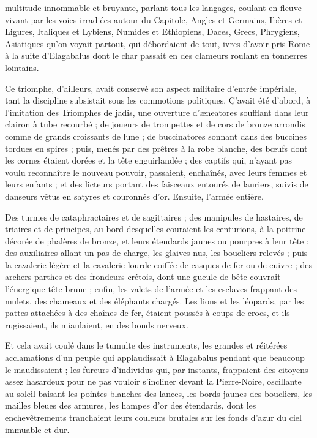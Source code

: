 \documentclass[a4paper, 11pt, oneside, polutonikogreek, french]{article}
\begin{document}
multitude innommable et bruyante, parlant tous les langages, coulant en fleuve vivant par les voies irradiées autour du Capitole, Angles et Germains, Ibères et Ligures, Italiques et Lybiens, Numides et Ethiopiens, Daces, Grecs, Phrygiens, Asiatiques qu'on voyait partout, qui débordaient de tout, ivres d'avoir pris Rome à la suite d'Elagabalus dont le char passait en des clameurs roulant en tonnerres lointains.

Ce triomphe, d'ailleurs, avait conservé son aspect militaire d'entrée impériale, tant la discipline subsistait sous les commotions politiques. Ç'avait été d'abord, à l'imitation des Triomphes de jadis, une ouverture d'æneatores soufflant dans leur clairon à tube recourbé ; de joueurs de trompettes et de cors de bronze arrondis comme de grands croissants de lune ; de buccinatores sonnant dans des buccines tordues en spires ; puis, menés par des prêtres à la robe blanche, des bœufs dont les cornes étaient dorées et la tête enguirlandée ; des captifs qui, n'ayant pas voulu reconnaître le nouveau pouvoir, passaient, enchaînés, avec leurs femmes et leurs enfants ; et des licteurs portant des faisceaux entourés de lauriers, suivis de danseurs vêtus en satyres et couronnés d'or. Ensuite, l'armée entière.

Des turmes de cataphractaires et de sagittaires ; des manipules de hastaires, de triaires et de principes, au bord desquelles couraient les centurions, à la poitrine décorée de phalères de bronze, et leurs étendards jaunes ou pourpres à leur tête ; des auxiliaires allant un pas de charge, les glaives nus, les boucliers relevés ; puis la cavalerie légère et la cavalerie lourde coiffée de casques de fer ou de cuivre ; des archers parthes et des frondeurs crétois, dont une gueule de bête couvrait l'énergique tête brune ; enfin, les valets de l'armée et les esclaves frappant des mulets, des chameaux et des éléphants chargés. Les lions et les léopards, par les pattes attachées à des chaînes de fer, étaient poussés à coups de crocs, et ils rugissaient, ils miaulaient, en des bonds nerveux.

Et cela avait coulé dans le tumulte des instruments, les grandes et réitérées acclamations d'un peuple qui applaudissait à Elagabalus pendant que beaucoup le maudissaient ; les fureurs d'individus qui, par instants, frappaient des citoyens assez hasardeux pour ne pas vouloir s'incliner devant la Pierre-Noire, oscillante au soleil baisant les pointes blanches des lances, les bords jaunes des boucliers, les mailles bleues des armures, les hampes d'or des étendards, dont les enchevêtrements tranchaient leurs couleurs brutales sur les fonds d'azur du ciel immuable et dur.
\end{document}
